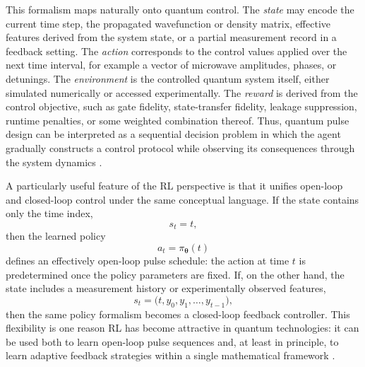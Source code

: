 This formalism maps naturally onto quantum control. The \emph{state} may encode the current time step, the propagated wavefunction or density matrix, effective features derived from the system state, or a partial measurement record in a feedback setting. The \emph{action} corresponds to the control values applied over the next time interval, for example a vector of microwave amplitudes, phases, or detunings. The \emph{environment} is the controlled quantum system itself, either simulated numerically or accessed experimentally. The \emph{reward} is derived from the control objective, such as gate fidelity, state-transfer fidelity, leakage suppression, runtime penalties, or some weighted combination thereof. Thus, quantum pulse design can be interpreted as a sequential decision problem in which the agent gradually constructs a control protocol while observing its consequences through the system dynamics \cite{Giannelli2022,Bukov2018,Niu2019}.

A particularly useful feature of the RL perspective is that it unifies open-loop and closed-loop control under the same conceptual language. If the state contains only the time index,
\begin{equation}
s_t = t,
\label{eq:time_only_state}
\end{equation}
then the learned policy
\begin{equation}
a_t = \pi_{\bm{\theta}}(t)
\label{eq:open_loop_rl_policy}
\end{equation}
defines an effectively open-loop pulse schedule: the action at time $t$ is predetermined once the policy parameters are fixed. If, on the other hand, the state includes a measurement history or experimentally observed features,
\begin{equation}
s_t = \bigl(t,y_0,y_1,\dots,y_{t-1}\bigr),
\label{eq:feedback_state_rl}
\end{equation}
then the same policy formalism becomes a closed-loop feedback controller. This flexibility is one reason RL has become attractive in quantum technologies: it can be used both to learn open-loop pulse sequences and, at least in principle, to learn adaptive feedback strategies within a single mathematical framework \cite{SuttonBarto2018,Giannelli2022}.

